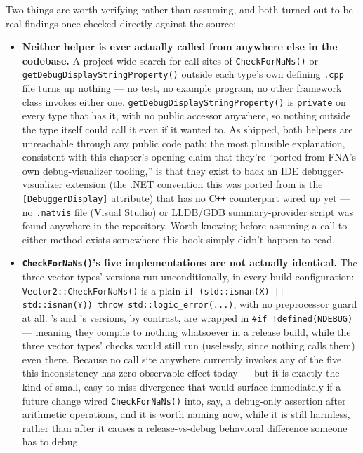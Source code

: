Two things are worth verifying rather than assuming, and both turned out to be real findings
once checked directly against the source:

\begin{itemize}
\item \textbf{Neither helper is ever actually called from anywhere else in the codebase.} A
  project-wide search for call sites of \texttt{CheckForNaNs()} or
  \texttt{getDebugDisplayStringProperty()} outside each type's own defining \texttt{.cpp} file
  turns up nothing --- no test, no example program, no other framework class invokes either
  one. \texttt{getDebugDisplayStringProperty()} is \texttt{private} on every type that has it,
  with no public accessor anywhere, so nothing outside the type itself could call it even if it
  wanted to. As shipped, both helpers are unreachable through any public code path; the most
  plausible explanation, consistent with this chapter's opening claim that they're ``ported
  from FNA's own debug-visualizer tooling,'' is that they exist to back an IDE
  debugger-visualizer extension (the .NET convention this was ported from is the
  \texttt{[DebuggerDisplay]} attribute) that has no C\texttt{++} counterpart wired up yet --- no
  \texttt{.natvis} file (Visual Studio) or LLDB/GDB summary-provider script was found anywhere
  in the repository. Worth knowing before assuming a call to either method exists somewhere
  this book simply didn't happen to read.
\item \textbf{\texttt{CheckForNaNs()}'s five implementations are not actually identical.} The
  three vector types' versions run unconditionally, in every build configuration:
  \texttt{Vector2::CheckForNaNs()} is a plain \texttt{if (std::isnan(X) ||
  std::isnan(Y)) throw std::logic\_error(...)}, with no preprocessor guard at all.
  's and 's versions, by contrast, are wrapped in
  \texttt{\#if !defined(NDEBUG)} --- meaning they compile to nothing whatsoever in a release
  build, while the three vector types' checks would still run (uselessly, since nothing calls
  them) even there. Because no call site anywhere currently invokes any of the five, this
  inconsistency has zero observable effect today --- but it is exactly the kind of small,
  easy-to-miss divergence that would surface immediately if a future change wired
  \texttt{CheckForNaNs()} into, say, a debug-only assertion after arithmetic operations, and it
  is worth naming now, while it is still harmless, rather than after it causes a
  release-vs-debug behavioral difference someone has to debug.
\end{itemize}

